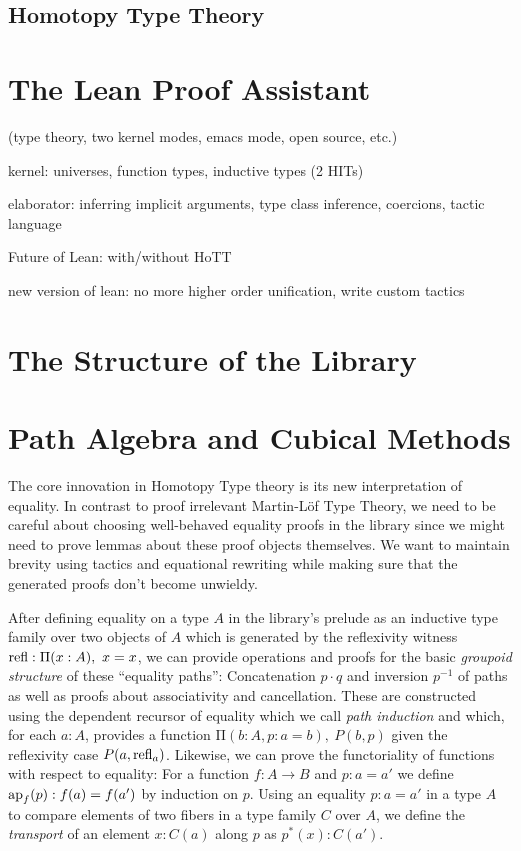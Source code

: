 \documentclass{llncs}
\newcommand{\fa}[2]{\ensuremath{\mathrm{\Pi}(#1),\ #2}}
\newcommand{\myap}{\textnormal{ap}}
\newcommand{\refl}{\textnormal{refl}}
\newcommand{\ct}{\cdot}
\newcommand{\inv}{^{-1}}
\begin{document}
\subsection{Homotopy Type Theory}
\label{sec:hott}

\section{The Lean Proof Assistant}
\label{sec:lean}

\cite{Moura2015}

(type theory, two kernel modes, emacs mode, open source, etc.)

kernel: universes, function types, inductive types (2 HITs)

elaborator: inferring implicit arguments, type class inference, coercions, tactic language

Future of Lean: with/without HoTT

new version of lean: no more higher order unification, write custom tactics

\section{The Structure of the Library}
\label{sec:library}


\section{Path Algebra and Cubical Methods}
\label{sec:cubical}


The core innovation in Homotopy Type theory is its new interpretation of equality.
In contrast to proof irrelevant Martin-L\"of Type Theory, we need to be careful about
choosing well-behaved equality proofs in the library since we might need to prove
lemmas about these proof objects themselves.
We want to maintain brevity using tactics and equational rewriting while making sure
that the generated proofs don't become unwieldy.

After defining equality on a type $A$ in the library's prelude as an inductive
type family over two objects of $A$ which is generated by the reflexivity witness
$\refl : \fa{x : A}{x = x}$, we can provide operations and proofs for the basic
\emph{groupoid structure} of these ``equality paths'':
Concatenation $p \ct q$ and inversion $p\inv$ of paths as well as proofs about
associativity and cancellation.
These are constructed using the dependent recursor of equality which we call \emph{path
 induction} and which, for each $a : A$, provides a function $\fa{b : A, p : a = b} P(b, p)$
given the reflexivity case $P(a, \refl_a)$.
Likewise, we can prove the functoriality of functions with respect to equality:
For a function $f : A \to B$ and $p : a = a'$ we define $\myap_f(p) : f(a) = f(a')$ by
induction on $p$.
Using an equality $p : a = a'$ in a type $A$ to compare elements of two fibers in
a type family $C$ over $A$, we define the \emph{transport} of an element $x : C(a)$
along $p$ as $p^*(x) : C(a')$.
\end{document}
